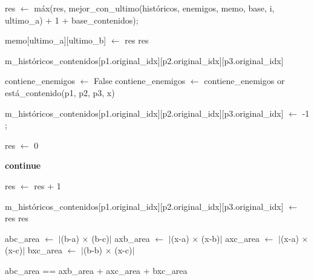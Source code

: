 \begin{algorithmic}
			 
				\State res $\gets$ máx(res, mejor_con_ultimo(históricos, enemigos, memo, base, i, ultimo_a) + 1 + base_contenidos);

			\EndIf

		\EndFor
	\EndIf

	\State memo[ultimo_a][ultimo_b] $\gets$ res
	\State \Return res

\EndFunction

\vspace{2em}

	\State {}
		\State \Return m_históricos_contenidos[p1.original_idx][p2.original_idx][p3.original_idx]
	\EndIf

	\State contiene_enemigos $\gets$ False
		\State contiene_enemigos $\gets$ contiene_enemigos or está_contenido(p1, p2, p3, x)
	\EndFor

		\State m_históricos_contenidos[p1.original_idx][p2.original_idx][p3.original_idx] $\gets$ -1
        \State {};
	\EndIf

	\State res $\gets$ 0

             \State \textbf{continue}
        \EndIf

        	\State res $\gets$ res + 1
        \EndIf
	\EndFor

	\State m_históricos_contenidos[p1.original_idx][p2.original_idx][p3.original_idx] $\gets$ res
	\State \Return res

\EndFunction

\vspace{2em}

	\State abc_area $\gets$ $|$(b-a) $\times$ (b-c)$|$
	\State axb_area $\gets$ $|$(x-a) $\times$ (x-b)$|$
	\State axc_area $\gets$ $|$(x-a) $\times$ (x-c)$|$
	\State bxc_area $\gets$ $|$(b-b) $\times$ (x-c)$|$

	\State \Return abc_area == axb_area + axc_area + bxc_area
\EndFunction

\end{algorithmic}



